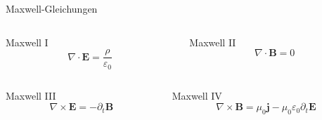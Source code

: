 \documentclass{beamer}
\begin{document}
\begin{frame}{Maxwell-Gleichungen}
  \begin{columns}[t, onlytextwidth]
    \begin{column}{0.45\textwidth}
      \begin{block}{Maxwell I}
        \begin{equation}
          \nabla \cdot \symbf{E} = \frac{ρ}{ε_0}
        \end{equation}
      \end{block}
    \end{column}
    \begin{column}{0.45\textwidth}
      \begin{block}{Maxwell II}
        \begin{equation}
          \nabla \cdot \symbf{B} = 0
        \end{equation}
      \end{block}
    \end{column}
  \end{columns}
  \begin{columns}[t, onlytextwidth]
    \begin{column}{0.45\textwidth}
      \begin{block}{Maxwell III}
        \begin{equation}
          \nabla \times \symbf{E} = - \partial_t \symbf{B}
        \end{equation}
      \end{block}
    \end{column}
    \begin{column}{0.45\textwidth}
      \begin{block}{Maxwell IV}
        \setlength{\abovedisplayskip}{0pt}
        \begin{equation}
          \nabla \times \symbf{B} = μ_0 \symbf{j} - μ_0 ε_0 \partial_t \symbf{E}
        \end{equation}
      \end{block}
    \end{column}
  \end{columns} 
\end{frame}
\end{document}
